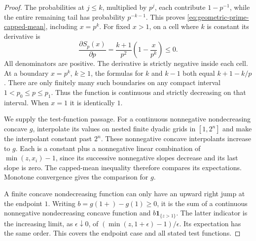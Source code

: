 \documentclass[11pt]{article}
\theoremstyle{definition}
\begin{document}
\begin{proof}
The probabilities at $j\le k$, multiplied by $p^j$, each contribute
$1-p^{-1}$, while the entire remaining tail has probability $p^{-k-1}$.
This proves \eqref{eq:geometric-prime-capped-mean}, including $x=p^k$.
For fixed $x>1$, on a cell where $k$ is constant its derivative is
\begin{equation}
 \frac{\partial S_p(x)}{\partial p}
      =\frac{k+1}{p^2}\left(1-\frac{x}{p^k}\right)\le0.
 \label{eq:geometric-prime-capped-derivative}
\end{equation}
All denominators are positive. The derivative is strictly negative
inside each cell.
At a boundary $x=p^k$, $k\ge1$, the formulas for $k$ and $k-1$
both equal $k+1-k/p$.
There are only finitely many such boundaries on any compact interval
$1<p_0\le p\le p_1$.
Thus the function is continuous and strictly decreasing on that
interval. When $x=1$ it is identically $1$.

We supply the test-function passage.
For a continuous nonnegative nondecreasing concave $g$, interpolate
its values on nested finite dyadic grids in $[1,2^n]$ and make the
interpolant constant past $2^n$.
These nonnegative concave interpolants increase to $g$.
Each is a constant plus a nonnegative linear combination of
$\min(z,x_i)-1$, since its successive nonnegative slopes decrease
and its last slope is zero.
The capped-mean inequality therefore compares its expectations.
Monotone convergence gives the comparison for $g$.

A finite concave nondecreasing function can only have an upward
right jump at the endpoint $1$.
Writing $b=g(1+)-g(1)\ge0$, it is the sum of a continuous
nonnegative nondecreasing concave function and $b\boldsymbol1_{\{z>1\}}$.
The latter indicator is the increasing limit, as $\epsilon\downarrow0$,
of $(\min(z,1+\epsilon)-1)/\epsilon$.
Its expectation has the same order.
This covers the endpoint case and all stated test functions.
\end{proof}
\end{document}

